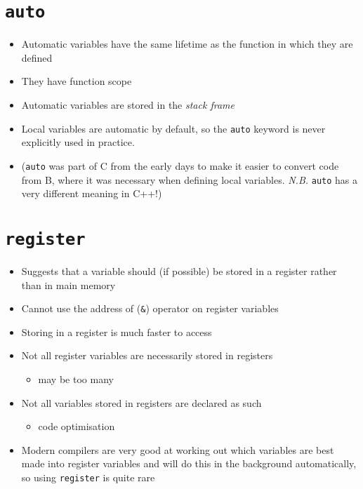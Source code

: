 \documentclass{article}
\begin{document}
\section{\texttt{auto}}
\begin{itemize}
\item Automatic variables have the same lifetime as the function in which they are defined
\item They have function scope
\item Automatic variables are stored in the \emph{stack frame}
\item Local variables are automatic by default, so the \verb!auto! keyword is never explicitly used in practice.
\item (\verb!auto! was part of C from the early days to make it easier to convert code from B, where it was necessary when defining local variables. \emph{N.B.} \verb!auto! has a very different meaning in C++!)
\end{itemize}



\section{\texttt{register}}
\begin{itemize}
\item Suggests that a variable should (if possible) be stored in a register rather than in main memory
\item Cannot use the address of (\verb!&!) operator on register variables
\item Storing in a register is much faster to access
\item Not all register variables are necessarily stored in registers 
\begin{itemize}
\item may be too many
\end{itemize}
\item Not all variables stored in registers are declared as such 
\begin{itemize}
\item code optimisation
\end{itemize}
\item Modern compilers are very good at working out which variables are best made into register variables and will do this in the background automatically, so using \verb!register! is quite rare
\end{itemize}
\end{document}
